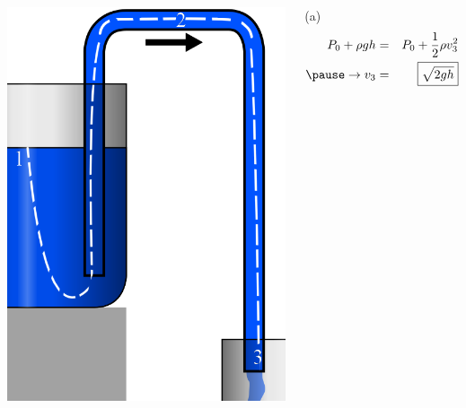 \documentclass[]{beamer}
\begin{document}



    \begin{frame}


      \begin{columns}[c]
        \column{2in}  %
     
        \begin{center}
          \includegraphics[height=2.in]{images2/Syphon_streamline.png}
        \end{center}

        \column{2.8in}
     
        \textcolor{mypink1}{  (a) 
        \begin{eqnarray*}
        P_0+\rho g h&=&P_0+\frac{1}{2} \rho v_3^2\\
          \pause
          \rightarrow v_3&=& \boxed{\sqrt{2gh}}\\
        \end{eqnarray*}
              }

        \end{columns}
     


    
      \end{frame}


\end{document}
